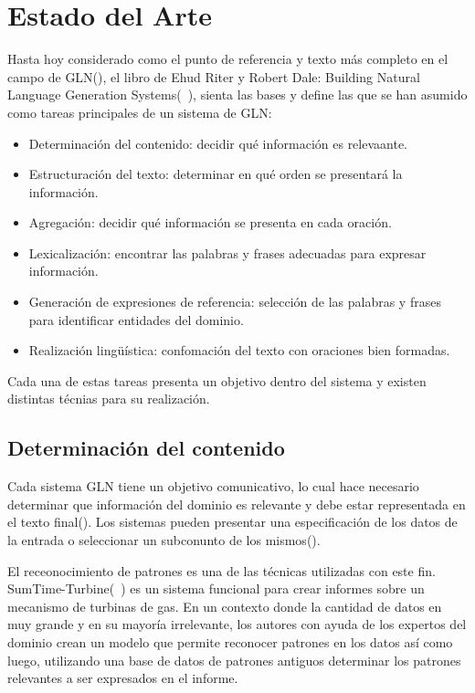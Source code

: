 \chapter{Estado del Arte}\label{chapter:state-of-the-art}

    Hasta hoy considerado como el punto de referencia y texto más completo en el campo de GLN(\cite{Gatt2018SurveyOT}), el libro de Ehud Riter y
Robert Dale: Building Natural Language Generation Systems(~\cite{reiter_dale_2000}), sienta las bases y define las que se han asumido como tareas principales 
de un sistema de GLN:

\begin{itemize}
    \item Determinación del contenido: decidir qué información es relevaante.
    \item Estructuración del texto: determinar en qué orden se presentará la información.
    \item Agregación: decidir qué información se presenta en cada oración.
    \item Lexicalización: encontrar las palabras y frases adecuadas para expresar información.
    \item Generación de expresiones de referencia: selección de las palabras y frases para identificar entidades del dominio.
    \item Realización lingüística: confomación del texto con oraciones bien formadas.
\end{itemize}

Cada una de estas tareas presenta un objetivo dentro del sistema y existen distintas técnias para su realización.
    
\section{Determinación del contenido}

    Cada sistema GLN tiene un objetivo comunicativo, lo cual hace necesario determinar que información del dominio es relevante y debe 
estar representada en el texto final(\cite{reiter_dale_2000}). Los sistemas pueden presentar una especificación de los datos de la entrada 
o seleccionar un subconunto de los mismos(\cite{reiter_dale_2000}).

    El receonocimiento de patrones es una de las t\'ecnicas utilizadas con este fin.  SumTime-Turbine(~\cite{Yu2006ChoosingTC}) es un sistema funcional para crear
 informes sobre un mecanismo de turbinas de gas. En un contexto donde la cantidad de datos en muy grande y en su mayoría irrelevante, 
 los autores con ayuda de los expertos del dominio crean un modelo que permite reconocer patrones en los datos así como luego, utilizando una base de datos de patrones 
antiguos determinar los patrones relevantes a ser expresados en el informe. 

